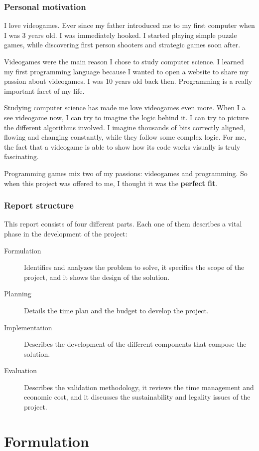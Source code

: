\documentclass[a4paper,11pt,titlepage,abstract,numbers=noenddot,automark,mnsy,intlimits,rgb,dvipsnames]{report}
\begin{document}
\section{Personal motivation}
I love videogames. Ever since my father introduced me to my first computer when I was 3 years old.
I was immediately hooked. I started playing simple puzzle games, while discovering first person shooters and strategic
games soon after.

Videogames were the main reason I chose to study computer science. I learned my first
programming language because I wanted to open a website
to share my passion about videogames. I was 10 years old back then. Programming is a really important
facet of my life.

Studying computer science has made me love videogames even more. When I a see videogame now, I can try to
imagine the logic
behind it. I can try to picture the different algorithms involved. I imagine thousands of bits correctly aligned,
flowing and changing constantly, while they follow some complex logic. For me, the fact that a videogame is
able to show how its code works visually is truly fascinating.

Programming games mix two of my passions: videogames and programming. So when this project was offered to me,
I thought it was the \textbf{perfect fit}.
\section{Report structure}
This report consists of four different parts. Each one of them describes a vital phase in the development of
the project:
\begin{description}
\item[Formulation]
Identifies and analyzes the problem to solve, it specifies the scope of
  the project, and it shows the design of the solution.
\item[Planning]
Details the time plan and the budget to develop the project.
\item[Implementation]
Describes the development of the different components that compose the solution.
\item[Evaluation]
Describes the validation methodology, it reviews the time management and economic cost,
  and it discusses the sustainability and legality issues of the project.
\end{description}
\part{Formulation}
\end{document}
